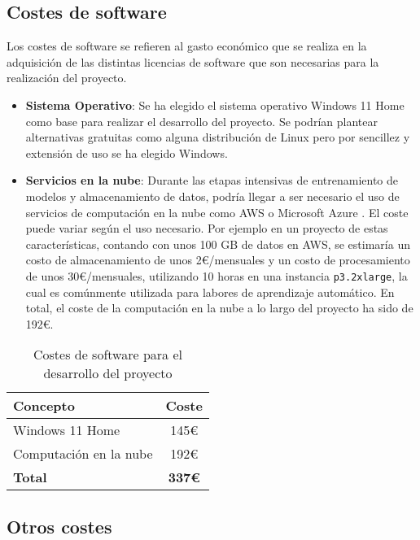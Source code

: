 \subsection{Costes de software}
Los costes de software se refieren al gasto económico que se realiza en la adquisición de las distintas licencias de software que son necesarias para la realización del proyecto.

\begin{itemize}
\tightlist
\item \textbf{Sistema Operativo}: Se ha elegido el sistema operativo Windows 11 Home como base para realizar el desarrollo del proyecto. Se podrían plantear alternativas gratuitas como alguna distribución de Linux pero por sencillez y extensión de uso se ha elegido Windows.

\item \textbf{Servicios en la nube}: Durante las etapas intensivas de entrenamiento de modelos y almacenamiento de datos, podría llegar a ser necesario el uso de servicios de computación en la nube como AWS \cite{AWS} o Microsoft Azure \cite{Kcpitt}. El coste puede variar según el uso necesario. Por ejemplo en un proyecto de estas características, contando con unos 100 GB de datos en AWS, se estimaría un costo de almacenamiento de unos 2€/mensuales y un costo de procesamiento de unos 30€/mensuales, utilizando 10 horas en una instancia \texttt{p3.2xlarge}, la cual es comúnmente utilizada para labores de aprendizaje automático. En total, el coste de la computación en la nube a lo largo del proyecto ha sido de 192€.
\end{itemize}

\begin{table}[h]
\centering
\begin{tabular}{|l|c|}
\hline
\textbf{Concepto} & \textbf{Coste} \\
\hline
Windows 11 Home \cite{win11} & 145€ \\
Computación en la nube & 192€ \\
\hline
\textbf{Total} & \textbf{337€} \\
\hline
\end{tabular}
\caption{Costes de software para el desarrollo del proyecto}
\end{table}

\subsection{Otros costes}

